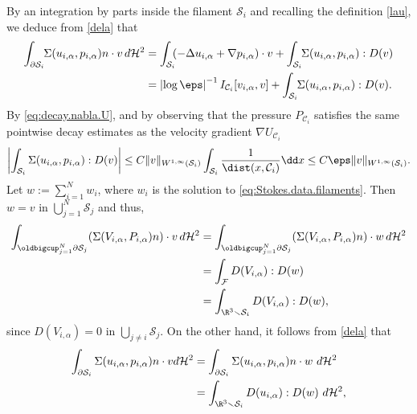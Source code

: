 By an integration by parts inside the filament $\mathcal S_{i}$ and recalling the definition \eqref{lau}, we deduce from \eqref{dela} that
\begin{equation}
\begin{aligned}
\int_{\partial \mathcal S_{i}}\hspace*{-1mm} \Sigma(u_{i,\alpha},p_{i,\alpha}) n \cdot v \, d\mathcal{H}^2
&= \int_{\mathcal S_{i}}\hspace*{-1mm} (-\Delta u_{i,\alpha} + \nabla p_{i,\alpha}) \cdot v + \int_{\mathcal S_{i}}\hspace*{-1mm} \Sigma(u_{i,\alpha},p_{i,\alpha}) : D(v) \\
\label{24}
& = \left|\log \eps\right|^{-1} I_{\mathcal{C}_i } [v_{i,\alpha},v]
+ \int_{\mathcal S_{i}}\hspace*{-1mm} \Sigma(u_{i,\alpha},p_{i,\alpha}) : D(v).
\end{aligned}
\end{equation}
By \eqref{eq:decay.nabla.U}, and by observing that the pressure $P_{\mathcal C_i}$ satisfies the same pointwise decay estimates as the velocity gradient $\nabla U_{\mathcal C_i}$
\begin{equation}
\label{doute}
\biggl|\int_{\mathcal S_{i}} \Sigma(u_{i,\alpha},p_{i,\alpha}) : D(v)\biggr| \leq C \|v\|_{W^{1,\infty}{(\mathcal S_{i})}} \int_{\mathcal S_{i}} \frac 1 {\dist(x,\mathcal C_i)} \dd x \leq C \eps \|v\|_{W^{1,\infty}{(\mathcal S_{i})}}.
\end{equation}
Let $w := \sum_{i=1}^N w_i$, where $w_i$ is the solution to \eqref{eq:Stokes.data.filaments}.
Then $w = v$ in $\bigcup_{j=1}^N \mathcal S_j$ and thus,
\begin{align*}
\int_{\oldbigcup_{j=1}^N \partial \mathcal S_j} (\Sigma (V_{i,\alpha}, P_{i,\alpha}) n) \cdot v \, d\mathcal{H}^2
&= \int_{\oldbigcup_{j=1}^N \partial \mathcal S_j} (\Sigma (V_{i,\alpha}, P_{i,\alpha}) n) \cdot w \, d\mathcal{H}^2
\\ & =
\int_{\mathcal F} D(V_{i,\alpha}) : D(w)
\\ & =
\int_{\R^3 \smallsetminus \mathcal S_i } D(V_{i,\alpha}) : D(w),
\end{align*}
since
$D (V_{i, \alpha}) = 0 $ in $\bigcup_{{j\neq i}} \mathcal S_j$. On the other hand, it follows from \eqref{dela} that
\begin{align*}
\int_{\partial \mathcal S_i} \Sigma (u_{i,\alpha}, p_{i,\alpha}) n \cdot v {d\mathcal{H}^2} &= \int_{\partial \mathcal S_i} \Sigma (u_{i,\alpha}, p_{i,\alpha}) n \cdot w {\
d\mathcal{H}^2}
\\ &=
\int_{\R^3 \smallsetminus \mathcal S_i } D(u_{i,\alpha}) : D(w) {\
d\mathcal{H}^2},
\end{align*}

